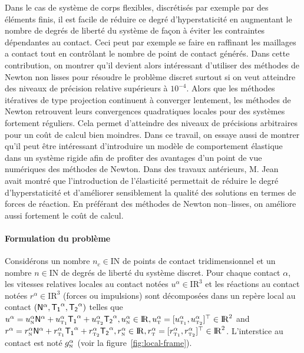 \documentclass{CSMA2017}
\def\RR{\nbR}
\def\NN{\nbN}
\def\nbR{\ensuremath{\mathrm{I\!R}}} %
\def\nbN{\ensuremath{\mathrm{I\!N}}} %
\def\n{{\hbox{\tiny{N}}}}
\def\t{{\hbox{\tiny{T}}}}
\def\tone{{\hbox{\tiny{T}}}_{\hbox{\tiny{1}}}}
\def\ttwo{{\hbox{\tiny{T}}}_{\hbox{\tiny{2}}}}
\begin{document}
Dans le cas de système de corps flexibles, discrétisés par exemple par des éléments finis, il est facile de réduire ce degré d'hyperstaticité en augmentant le nombre de degrés de liberté du système de façon à éviter les contraintes dépendantes au contact. Ceci peut par exemple se faire en raffinant les maillages a contact tout en contrôlant le nombre de point de contact générés.
%
Dans cette contribution, on montrer qu'il devient alors intéressant d'utiliser des méthodes de Newton non lisses pour résoudre le problème discret surtout si on veut atteindre des niveaux de précision relative supérieurs à $10^{-4}$.  Alors que les méthodes itératives de type projection continuent à converger lentement, les méthodes de Newton retrouvent leurs convergences quadratiques locales pour des systèmes fortement réguliers. Cela permet d'atteindre des niveaux de précisions arbitraires pour un coût de calcul bien moindres. Dans ce travail, on essaye aussi de montrer qu'il peut être intéressant d'introduire  un modèle de comportement élastique dans un système rigide afin de profiter des avantages d'un point de vue numériques des méthodes de Newton. Dans des travaux antérieurs, M. Jean~\cite{Jean1999,Acary.Jean98} avait montré que l'introduction de l'élasticité permettait de réduire le degré d'hyperstaticité et d'améliorer sensiblement la qualité des solutions en termes de forces de réaction. En préférant des méthodes de Newton non--lisses, on améliore aussi fortement le coût de calcul.


\paragraph{Formulation du problème}

Considérons un nombre  $n_c\in \NN$ de points de contact tridimensionnel et un nombre   $n\in\NN$ de degrés de liberté du système discret. Pour chaque contact $\alpha$, les vitesses relatives locales au contact notées  $u^\alpha\in\RR^3$ et les réactions au contact notées $r^\alpha\in\RR^3$ (forces ou impulsions) sont décomposées dans un repère local au contact $({\sf N}^\alpha,{\sf T_1}^\alpha,{\sf T_2}^\alpha)$ telles que  $u^\alpha = u^\alpha_{\n} {\sf N}^\alpha +   u^{\alpha}_{\tone}{\sf T_1}^\alpha + u^{\alpha}_{\ttwo}{\sf T_2}^\alpha , u^\alpha_{\n} \in \RR, u^\alpha_{\t} = [u^{\alpha}_{\tone},u^{\alpha}_{\ttwo}]^\top \in \RR^2$ and  $r^\alpha = r^\alpha_{\n} {\sf N}^\alpha +   r^{\alpha}_{\tone}{\sf T_1}^\alpha + r^{\alpha}_{\ttwo}{\sf T_2}^\alpha  , r^\alpha_{\n} \in \RR, r^\alpha_{\t}=[r^{\alpha}_{\tone},r^{\alpha}_{\ttwo}]^\top \in \RR^2$. L'interstice au contact est noté $g_\n^\alpha$ (voir la figure~\ref{fig:local-frame}).
\end{document}

